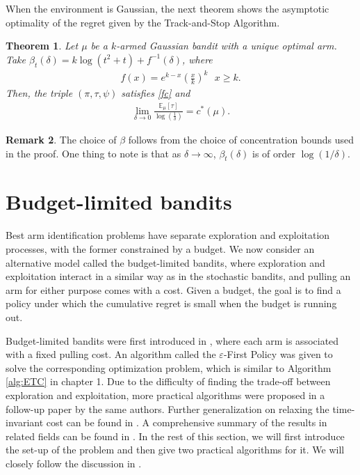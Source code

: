 \documentclass[letterpaper,10pt,openright,openany]{book}
\numberwithin{equation}{section}
\theoremstyle{plain}
\newtheorem{Th}{Theorem}[section]
\theoremstyle{definition}
\newtheorem{Rem}[Th]{Remark}
\def\E{{\mathbb E}}
\def\e{{\varepsilon}}
\begin{document}
When the environment is Gaussian, the next theorem shows the asymptotic optimality of the regret given by the Track-and-Stop Algorithm. 

\begin{Th}
Let $\mu$ be a $k$-armed Gaussian bandit with a unique optimal arm. Take $\beta_t(\delta)=k\log (t^2+t)+f^{-1}(\delta)$, where
\begin{align*}
f(x)=e^{k-x}\left(\frac{x}{k}\right)^k\ \ \ x\geq k. 
\end{align*}
Then, the triple $(\pi, \tau, \psi)$ satisfies \eqref{fc} and 
\begin{align*}
\displaystyle\lim_{\delta\to 0}\frac{\E_\mu[\tau]}{\log\left(\frac{1}{\delta}\right)}=c^*(\mu). 
\end{align*}
\end{Th}
\begin{Rem}
The choice of $\beta$ follows from the choice of concentration bounds used in the proof. One thing to note is that as $\delta\to\infty$, $\beta_t(\delta)$ is of order $\log(1/\delta)$. 
\end{Rem}

\section{Budget-limited bandits}

Best arm identification problems have separate exploration and exploitation processes, with the former constrained by a budget.  We now consider an alternative model called the budget-limited bandits, where exploration and exploitation interact in a similar way as in the stochastic bandits, and pulling an arm for either purpose comes with a cost. Given a budget, the goal is to find a policy under which the cumulative regret is small when the budget is running out. 

Budget-limited bandits were first introduced in \cite{tran2010epsilon}, where each arm is associated with a fixed pulling cost. An algorithm called the $\e$-First Policy was given to solve the corresponding optimization problem, which is similar to Algorithm \ref{alg:ETC} in chapter 1. 
Due to the difficulty of finding the trade-off between exploration and exploitation, more practical algorithms were proposed in a follow-up paper \cite{tran2012knapsack} by the same authors. Further generalization on relaxing the time-invariant cost can be found in \cite{ding2013multi}. A comprehensive summary of the results in related fields can be found in \cite{zhou2018budget}. In the rest of this section, we will first introduce the set-up of the problem and then give two practical algorithms for it. We will closely follow the discussion in \cite{tran2012knapsack}. 
\end{document}
